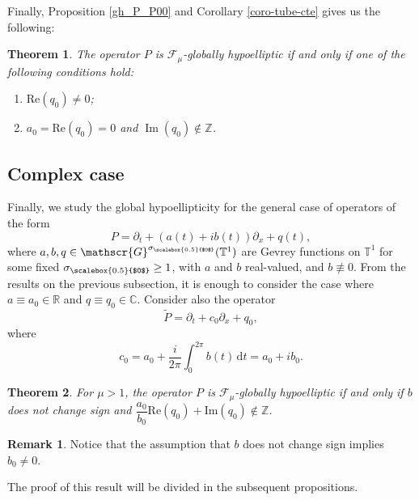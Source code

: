 \documentclass[11pt,reqno]{amsart}
\newtheorem{theorem}{Theorem}[section]
\numberwithin{equation}{section}
\theoremstyle{definition}
\newtheorem{obs}{Remark}
\theoremstyle{definition}
\newcommand{\T}{\mathbb{T}}
\newcommand{\R}{\mathbb{R}}
\newcommand{\Z}{\mathbb{Z}}
\newcommand{\Real}{\mathrm{Re}}
\newcommand{\Imag}{\mathrm{Im}}
\newcommand{\sigmac}{\sigma_{\scalebox{0.5}{$0$}}}
\begin{document}
Finally, Proposition \ref{gh_P_P00} and Corollary \ref{coro-tube-cte} gives us the following:

\begin{theorem}
    The operator $P$ is $\mathscr{F}_{\mu}$-globally hypoelliptic if and only if one of the following conditions hold:
    \begin{enumerate}
        \item[(i)] $\Real(q_0)\neq 0$;
        \item[(ii)] $a_0=\Real(q_0)=0$ and $\operatorname{Im}(q_0)\notin\Z$.
    \end{enumerate}
\end{theorem}

\subsection{Complex case} Finally, we study the global hypoellipticity for the general case of operators of the form
\[P=\partial_t+(a(t)+ib(t))\partial_x+q(t),\]
where $a,b,q\in\mathscr{G}^{\sigmac}(\T^1)$ are Gevrey functions on $\T^1$ for some fixed $\sigmac\geq 1$, with $a$ and $b$ real-valued, and $b\not\equiv 0$. From the results on the previous subsection, it is enough to consider the case where $a\equiv a_0\in\R$ and $q\equiv q_0\in\mathbb{C}$. Consider also the operator
\[\tilde P = \partial_t + c_0\partial_x+q_0,\]
where
\[c_0 = a_0 + \dfrac{i}{2\pi}\int_{0}^{2\pi}b(t)\,\mathrm{d}t = a_0+ib_0.\]

\begin{theorem}
    For $\mu >1$, the operator $P$ is $\mathscr{F}_{\mu}$-globally hypoelliptic if and only if  $b$ does not change sign and $\dfrac{a_0}{b_0}\Real(q_0)+\Imag(q_0)\not\in\Z$.
\end{theorem}

\begin{obs}
    Notice that the assumption that $b$ does not change sign implies $b_0\neq 0$. 
\end{obs}

The proof of this result will be divided in the subsequent propositions.
\end{document}
